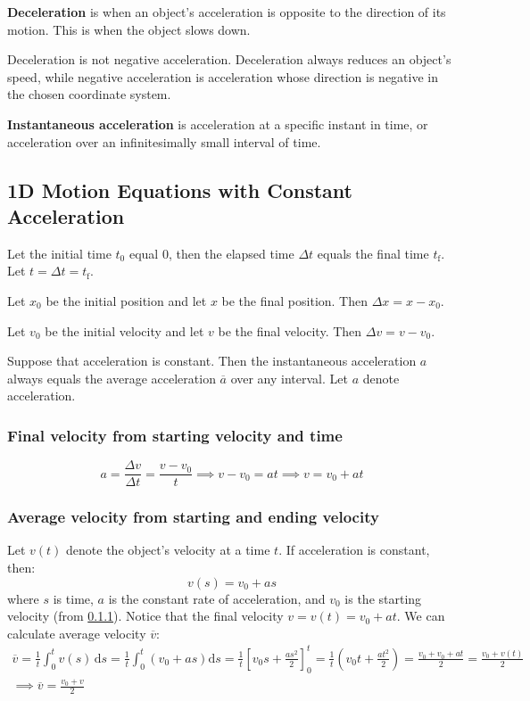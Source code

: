 \documentclass{article}
\newcommand{\definition}[1]{\begin{tcolorbox}[colback=red!5!white,colframe=red!75!black,parbox=false] #1 \end{tcolorbox}}
\begin{document}
\definition{\textbf{Deceleration} is when an object's acceleration is opposite to the direction of its motion. This is when the object slows down.}

Deceleration is not negative acceleration. Deceleration always reduces an object's speed, while negative acceleration is acceleration whose direction is negative in the chosen coordinate system.

\definition{\textbf{Instantaneous acceleration} is acceleration at a specific instant in time, or acceleration over an infinitesimally small interval of time.}

\subsection{1D Motion Equations with Constant Acceleration} \label{subsec:1Dkinematics}

Let the initial time $t_0$ equal $0$, then the elapsed time $\Delta t$ equals the final time $t_\text{f}$. Let $t=\Delta t=t_\text{f}$.

Let $x_0$ be the initial position and let $x$ be the final position. Then $\Delta x=x-x_0$.

Let $v_0$ be the initial velocity and let $v$ be the final velocity. Then $\Delta v=v-v_0$.

Suppose that acceleration is constant. Then the instantaneous acceleration $a$ always equals the average acceleration $\overline a$ over any interval. Let $a$ denote acceleration.

\subsubsection{Final velocity from starting velocity and time} \label{eq:finalvelocitystarttime}
\begin{equation*}
    a
	=\frac{\Delta v}{\Delta t}
	=\frac{v-v_0}{t}
	\implies v-v_0=at
	\implies \boxed{v=v_0+at}
\end{equation*}

\subsubsection{Average velocity from starting and ending velocity} \label{eq:avgvelstartend}

Let $v(t)$ denote the object's velocity at a time $t$. If acceleration is constant, then:
\begin{equation*}
    v(s)=v_0+as
\end{equation*}
where $s$ is time, $a$ is the constant rate of acceleration, and $v_0$ is the starting velocity (from \ref{eq:finalvelocitystarttime}). Notice that the final velocity $v=v(t)=v_0+at$. We can calculate average velocity $\overline v$:
\begin{gather*}
    \overline v
	=\frac 1t \int_{0}^{t}v(s)\,\mathrm{d}s
	=\frac 1t \int_{0}^{t}\left( v_0+as \right)\mathrm{d}s
	=\frac 1t \left[v_0s+\frac{as^2}{2}\right]_{0}^{t}
	=\frac 1t \left( v_0t+\frac{at^2}{2} \right)
	=\frac{v_0+v_0+at}{2}
	=\frac{v_0+v(t)}{2} \\
	\implies \boxed{\overline v=\frac{v_0+v}{2}}
\end{gather*}
\end{document}

